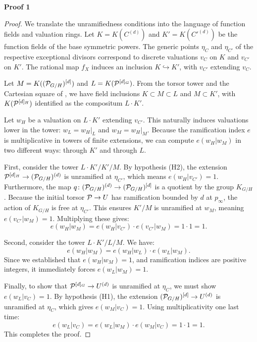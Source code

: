 \documentclass[11pt]{article}
\begin{document}
\textbf{Proof 1}
\begin{proof}
We translate the unramifiedness conditions into the language of function fields and valuation rings. Let $K = K(C^{(d)})$ and $K' = K(C'^{(d)})$ be the function fields of the base symmetric powers. The generic points $\eta_C$ and $\eta_{C'}$ of the respective exceptional divisors correspond to discrete valuations $v_C$ on $K$ and $v_{C'}$ on $K'$. The rational map $f_X$ induces an inclusion $K \hookrightarrow K'$, with $v_{C'}$ extending $v_C$.

Let $M = K((\mathcal{P}_{G/H})^{[d]})$ and $L = K(\mathcal{P}^{[d]_G})$. From the torsor tower and the Cartesian square of , we have field inclusions $K \subset M \subset L$ and $M \subset K'$, with $K(\mathcal{P}^{[d]_H})$ identified as the compositum $L \cdot K'$.

Let $w_H$ be a valuation on $L \cdot K'$ extending $v_{C'}$. This naturally induces valuations lower in the tower: $w_L = w_H|_L$ and $w_M = w_H|_M$. Because the ramification index $e$ is multiplicative in towers of finite extensions, we can compute $e(w_H | w_M)$ in two different ways: through $K'$ and through $L$.

First, consider the tower $L \cdot K' / K' / M$. By hypothesis (H2), the extension $\mathcal{P}^{[d]_H} \to (\mathcal{P}_{G/H})^{(d)}$ is unramified at $\eta_{C'}$, which means $e(w_H | v_{C'}) = 1$. Furthermore, the map $q \colon (\mathcal{P}_{G/H})^{(d)} \to (\mathcal{P}_{G/H})^{[d]}$ is a quotient by the group $K_{G/H}$. Because the initial torsor $\mathcal{P} \to U$ has ramification bounded by $d$ at $p_\infty$, the action of $K_{G/H}$ is free at $\eta_{C'}$. This ensures $K'/M$ is unramified at $w_M$, meaning $e(v_{C'} | w_M) = 1$. Multiplying these gives:
\[
e(w_H | w_M) = e(w_H | v_{C'}) \cdot e(v_{C'} | w_M) = 1 \cdot 1 = 1.
\]

Second, consider the tower $L \cdot K' / L / M$. We have:
\[
e(w_H | w_M) = e(w_H | w_L) \cdot e(w_L | w_M).
\]
Since we established that $e(w_H | w_M) = 1$, and ramification indices are positive integers, it immediately forces $e(w_L | w_M) = 1$.

Finally, to show that $\mathcal{P}^{[d]_G} \to U^{(d)}$ is unramified at $\eta_C$, we must show $e(w_L | v_C) = 1$. By hypothesis (H1), the extension $(\mathcal{P}_{G/H})^{[d]} \to U^{(d)}$ is unramified at $\eta_C$, which gives $e(w_M | v_C) = 1$. Using multiplicativity one last time:
\[
e(w_L | v_C) = e(w_L | w_M) \cdot e(w_M | v_C) = 1 \cdot 1 = 1.
\]
This completes the proof.
\end{proof}
\end{document}
